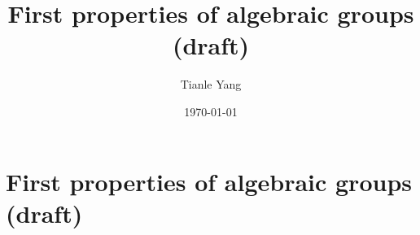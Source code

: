 \documentclass{noteformyself}
\title{First properties of algebraic groups (draft)}
\author{Tianle Yang}
\date{\today}
\begin{document}
    \maketitle

    \section{First properties of algebraic groups (draft)}



\end{document}
